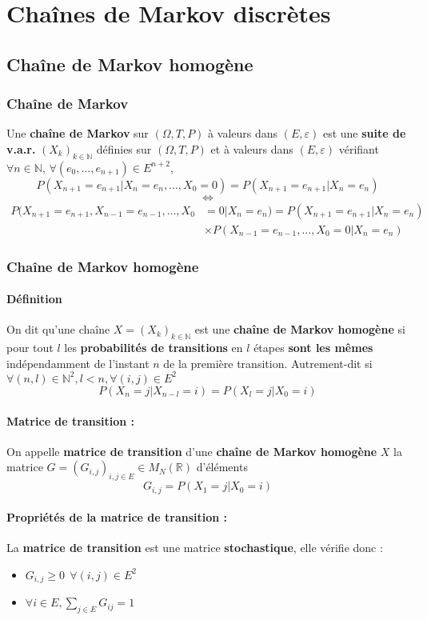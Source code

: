 \documentclass[10pt,a4paper,twoside]{article}
\begin{document}
\section{Chaînes de Markov discrètes}
\subsection{Chaîne de Markov homogène}
\subsubsection{Chaîne de Markov}
Une \textbf{chaîne de Markov} sur $(\Omega,T,P)$ à valeurs dans $(E,\varepsilon)$ est une \textbf{suite de v.a.r.} $(X_{k})_{k\in\mathbb{N}}$ définies sur $(\Omega,T,P)$ et à valeurs dans $(E,\varepsilon)$ vérifiant $\forall n\in\mathbb{N}$, $\forall(e_{0},\ldots,e_{n+1})\in E^{n+2}$,
$$P(X_{n+1}=e_{n+1}|X_{n}=e_{n},\ldots,X_{0}=0)=P(X_{n+1}=e_{n+1}|X_{n}=e_{n})$$
$$\Leftrightarrow$$
\begin{align*}
P(X_{n+1}=e_{n+1},X_{n-1}=e_{n-1},...,X_{0}  &  =0|X_{n}=e_{n})=P(X_{n+1}=e_{n+1}|X_{n}=e_{n})\\
  &  \times P(X_{n-1}=e_{n-1},\ldots,X_{0}=0|X_{n}=e_{n})
\end{align*}

\subsubsection{Chaîne de Markov homogène}
\paragraph{Définition} On dit qu'une chaîne $X=(X_{k})_{k\in\mathbb{N}}$ est une \textbf{chaîne de Markov homogène} si pour tout $l$ les \textbf{probabilités de transitions} en $l$ étapes \textbf{sont les mêmes} indépendamment de l'instant $n$ de la première transition. Autrement-dit si $\forall (n,l) \in \mathbb{N}^{2}, l<n,\forall(i,j)\in E^{2}$
\[ P(X_{n}=j|X_{n-l}=i)=P(X_{l}=j|X_{0}=i) \]

\paragraph{Matrice de transition :} On appelle \textbf{matrice de transition} d'une \textbf{chaîne de Markov homogène} $X$ la matrice $G=(G_{i,j})_{i,j\in E} \in M_{N}(\mathbb{R})$  d'éléments
\[ G_{i,j}=P(X_{1}=j|X_{0}=i)  \]

\paragraph{Propriétés de la matrice de transition :} La \textbf{matrice de transition} est une matrice \textbf{stochastique}, elle vérifie donc :
\begin{itemize}
\item $G_{i,j} \geqslant 0\ \ \forall(i,j)\in E^{2}$
\item $\forall i\in E, \sum_{j\in E} G_{ij} = 1$
\end{itemize}
\end{document}
